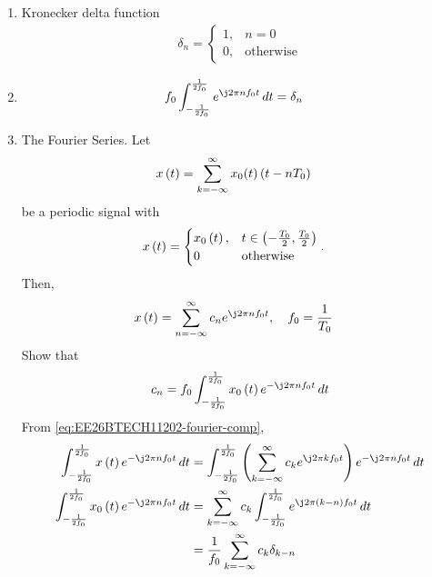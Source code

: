 \begin{enumerate}[label=\thesubsection.\arabic*, ref=\thesubsection.\theenumi]
\item Kronecker delta function
\begin{align}
\label{eq:EE26BTECH11202-kronecker}
\delta_{n}= 
\begin{cases} 
1, & n = 0 \\ 
0, & \text{otherwise}
\end{cases}
\end{align}
\item 
\begin{align}
f_0\int_{-\frac{1}{2f_0}}^{\frac{1}{2f_0}} e^{\j 2\pi n f_0 t} \, dt &= 
\delta_{n}
\label{eq:EE26BTECH11202-kronecker-exp-int}
\end{align}
\item The Fourier Series. Let
\begin{align}
\label{eq:EE26BTECH11202-fourier-periodic}
	x\left(t\right) &= \sum_{k=-\infty}^{\infty} x_0(t)\left(t-nT_0\right) 
\end{align}
be a periodic signal
with 
\begin{align}
\label{eq:EE26BTECH11202-fourier-fund}
	x\left(t\right) &=  \begin{cases}
		x_0\left(t\right), & t \in \left(-\frac{T_0}{2},\frac{T_0}{2}\right)
		\\
		0 & \text{otherwise}
\end{cases}
.
\end{align}
  Then, 
\begin{align}
\label{eq:EE26BTECH11202-fourier-comp}
	x\brak{t} &= \sum_{n=-\infty}^{\infty} c_n e^{\j 2\pi n f_0 t} , \quad f_0 = \frac{1}{T_0}
\end{align}
Show that 
\begin{align}
c_n = f_0 \int_{-\frac{1}{2f_0}}^{\frac{1}{2f_0}} x_0\brak{t} e^{-\j 2\pi n f_0 t} \, dt 
\label{eq:EE26BTECH11202-Fourier_1}
\end{align}
\solution
From \eqref{eq:EE26BTECH11202-fourier-comp},
\begin{align}
\int_{-\frac{1}{2f_0}}^{\frac{1}{2f_0}} x\brak{t} e^{-\j 2\pi n f_0 t} \, dt
&= \int_{-\frac{1}{2f_0}}^{\frac{1}{2f_0}} \brak{\sum_{k=-\infty}^{\infty} c_k e^{\j 2\pi k f_0 t}} e^{-\j 2\pi n f_0 t} \, dt 
\\
\int_{-\frac{1}{2f_0}}^{\frac{1}{2f_0}} x_0\brak{t} e^{-\j 2\pi n f_0 t} \, dt&=\sum_{k=-\infty}^{\infty} c_k \int_{-\frac{1}{2f_0}}^{\frac{1}{2f_0}} e^{\j 2\pi \brak{k - n} f_0 t} \, dt
\\
									      &									      = \frac{1}{f_0}\sum_{k=-\infty}^{\infty} c_k  \delta_{k - n} 
\end{align}

\end{enumerate}
